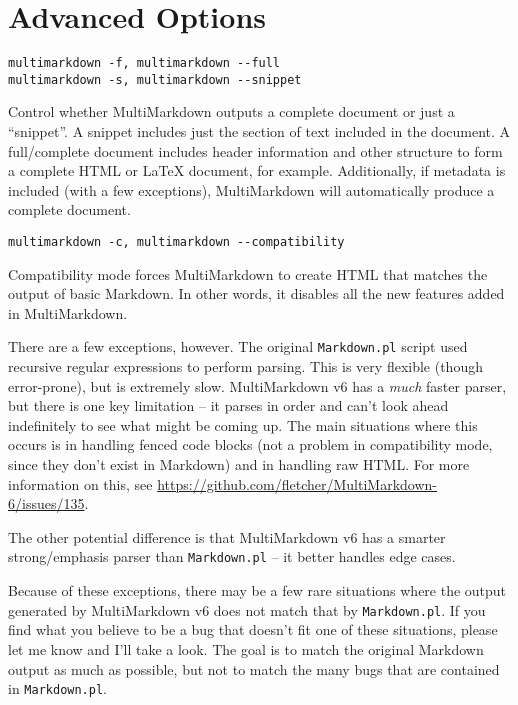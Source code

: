 \section{Advanced Options}
\label{advancedoptions}

\begin{verbatim}
multimarkdown -f, multimarkdown --full
multimarkdown -s, multimarkdown --snippet
\end{verbatim}

Control whether MultiMarkdown outputs a complete document or just a ``snippet''. A snippet includes just the section of text included in the document. A full\slash{}complete document includes header information and other structure to form a complete HTML or LaTeX document, for example. Additionally, if metadata is included (with a few exceptions), MultiMarkdown will automatically produce a complete document.

\begin{verbatim}
multimarkdown -c, multimarkdown --compatibility
\end{verbatim}

Compatibility mode forces MultiMarkdown to create HTML that matches the output of basic Markdown. In other words, it disables all the new features added in MultiMarkdown.

There are a few exceptions, however. The original \texttt{Markdown.pl} script used recursive regular expressions to perform parsing. This is very flexible (though error-prone), but is extremely slow. MultiMarkdown v6 has a \emph{much} faster parser, but there is one key limitation -- it parses in order and can't look ahead indefinitely to see what might be coming up. The main situations where this occurs is in handling fenced code blocks (not a problem in compatibility mode, since they don't exist in Markdown) and in handling raw HTML. For more information on this, see \href{https://github.com/fletcher/MultiMarkdown-6/issues/135}{https:\slash{}\slash{}github.com\slash{}fletcher\slash{}MultiMarkdown-6\slash{}issues\slash{}135}.

The other potential difference is that MultiMarkdown v6 has a smarter strong\slash{}emphasis parser than \texttt{Markdown.pl} -- it better handles edge cases.

Because of these exceptions, there may be a few rare situations where the output generated by MultiMarkdown v6 does not match that by \texttt{Markdown.pl}. If you find what you believe to be a bug that doesn't fit one of these situations, please let me know and I'll take a look. The goal is to match the original Markdown output as much as possible, but not to match the many bugs that are contained in \texttt{Markdown.pl}.

